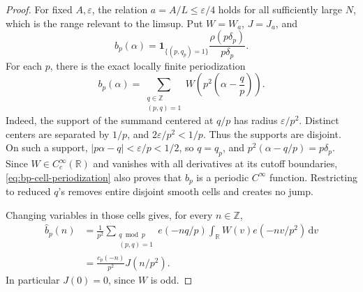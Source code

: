 \documentclass[11pt]{article}
\numberwithin{equation}{section}
\theoremstyle{definition}
\newcommand{\R}{\mathbb R}
\newcommand{\Z}{\mathbb Z}
\newcommand{\1}{\mathbf 1}
\newcommand{\dd}{\,\mathrm d}
\newcommand{\wh}{\widehat}
\begin{document}
\begin{proof}
For fixed \(A,\varepsilon\), the relation \(a=A/L\le\varepsilon/4\)
holds for all sufficiently large \(N\), which is the range relevant to
the limsup.  Put \(W=W_a\), \(J=J_a\), and
\[
 b_p(\alpha)=
 \1_{\{(p,q_p)=1\}}\frac{\rho(p\delta_p)}{p\delta_p}.
\]
For each \(p\), there is the exact locally finite periodization
\begin{equation}\label{eq:bp-cell-periodization}
 b_p(\alpha)=
 \sum_{\substack{q\in\Z\\(p,q)=1}}
 W\left(p^2\left(\alpha-\frac qp\right)\right).
\end{equation}
Indeed, the support of the summand centered at \(q/p\) has radius
\(\varepsilon/p^2\).  Distinct centers are separated by \(1/p\), and
\(2\varepsilon/p^2<1/p\).  Thus the supports are disjoint.  On such a
support, \(|p\alpha-q|<\varepsilon/p<1/2\), so \(q=q_p\), and
\(p^2(\alpha-q/p)=p\delta_p\).  Since
\(W\in C_c^\infty(\R)\) and vanishes with all derivatives at its cutoff
boundaries, \eqref{eq:bp-cell-periodization} also proves that \(b_p\)
is a periodic \(C^\infty\) function.  Restricting to reduced \(q\)'s
removes entire disjoint smooth cells and creates no jump.

Changing variables in those cells gives, for every \(n\in\Z\),
\begin{equation}\label{eq:near-bhat}
 \begin{aligned}
 \wh b_p(n)
 &=\frac1{p^2}
 \sum_{\substack{q\bmod p\\(p,q)=1}}e(-nq/p)
 \int_{\R}W(v)e(-nv/p^2)\dd v\\
 &=\frac{c_p(-n)}{p^2}J(n/p^2).
 \end{aligned}
\end{equation}
In particular \(J(0)=0\), since \(W\) is odd.


\end{proof}
\end{document}
